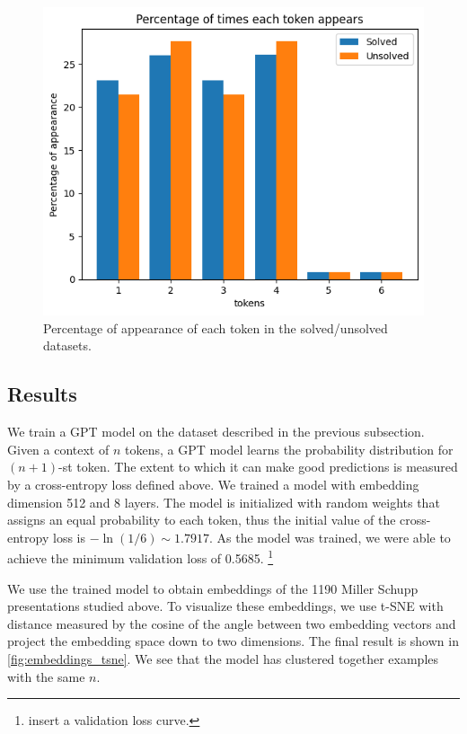 \begin{figure}
	\centering
	\includegraphics[scale=0.6]{fig/tokens_hist.png}
	\caption{Percentage of appearance of each token in the solved/unsolved datasets.}
	\label{fig:tokens_hist}
\end{figure}

\subsection{Results}
We train a GPT model on the dataset described in the previous subsection.
Given a context of $n$ tokens, a GPT model learns the probability distribution for $(n+1)$-st token.
The extent to which it can make good predictions is measured by a cross-entropy loss defined above.
We trained a model with embedding dimension 512 and 8 layers.
The model is initialized with random weights that assigns an equal probability to each token, thus the initial value of the cross-entropy loss is $-\ln(1/6) \sim 1.7917$.
As the model was trained, we were able to achieve the minimum validation loss of 0.5685.
\footnote{insert a validation loss curve.}

We use the trained model to obtain embeddings of the 1190 Miller Schupp presentations studied above.
To visualize these embeddings, we use t-SNE with distance measured by the cosine of the angle between two embedding vectors and project the embedding space down to two dimensions.
The final result is shown in \autoref{fig:embeddings_tsne}.
We see that the model has clustered together examples with the same $n$.

